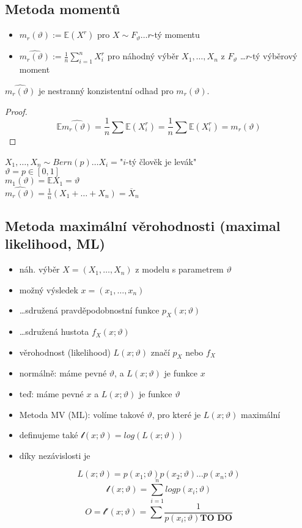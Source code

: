 \documentclass[../main.tex]{subfiles}
\begin{document}
\subsection{Metoda momentů}
\begin{itemize}
    \item $m_r(\vartheta) := \mathbb{E}(X^r)$ pro $X \sim F_\vartheta \dots r$-tý momentu
    \item $\widehat{m_r(\vartheta)}:= \frac{1}{n} \sum^n_{i=1}X^r_i$ pro náhodný výběr $X_1,\dots,X_n$ z $F_\vartheta$ \dots $r$-tý výběrový moment
\end{itemize}
\begin{theorem}
    $\widehat{m_r(\vartheta)}$ je nestranný konzistentní odhad pro $m_r(\vartheta)$.
    \begin{proof}
        \[\mathbb{E}\widehat{m_r(\vartheta)} = \frac{1}{n} \sum \mathbb{E}(X^r_i) = \frac{1}{n}\sum \mathbb{E}(X^r_i) = m_r(\vartheta)\]
    \end{proof}
\end{theorem}
\begin{example}
    $X_1,\dots,X_n \sim Bern(p) \dots X_i = $"$i$-tý člověk je levák"\\
    $\vartheta = p \in \left[0,1\right]$\\
    $m_1(\vartheta) = \mathbb{E}X_1 = \vartheta$\\
    $\widehat{m_r(\vartheta)} = \frac{1}{n}(X_1+\dots+X_n) = \overline{X}_n$
\end{example}

\subsection{Metoda maximální věrohodnosti (maximal likelihood, ML)}
\begin{itemize}
    \item náh. výběr $X = (X_1,\dots,X_n)$ z modelu s parametrem $\vartheta$
    \item možný výsledek $x = (x_1,\dots,x_n)$
    \item \dots sdružená pravděpodobnostní funkce $p_X(x;\vartheta)$
    \item \dots sdružená hustota $f_X(x;\vartheta)$
    \item věrohodnost (likelihood) $L(x;\vartheta)$ značí $p_X$ nebo $f_X$
    \item normálně: máme pevné $\vartheta$, a $L(x;\vartheta)$ je funkce $x$
    \item teď: máme pevné $x$ a $L(x;\vartheta)$ je funkce $\vartheta$
\end{itemize}
\begin{itemize}
    \item Metoda MV (ML): volíme takové $\vartheta$, pro které je $L(x;\vartheta)$ maximální
    \item definujeme také $\mathcal{l}(x;\vartheta) = log(L(x;\vartheta))$
    \item díky nezávislosti je
\end{itemize}
\[L(x;\vartheta) = p(x_1;\vartheta)p(x_2;\vartheta)\dots p(x_n;\vartheta)\]
\[\mathcal{l}(x;\vartheta) = \sum^n_{i=1} log p(x_i;\vartheta)\]
\[ O = \mathcal{l}'(x;\vartheta) = \sum \frac{1}{p(x_i;\vartheta) \textbf{TO DO}}\]
\end{document}
